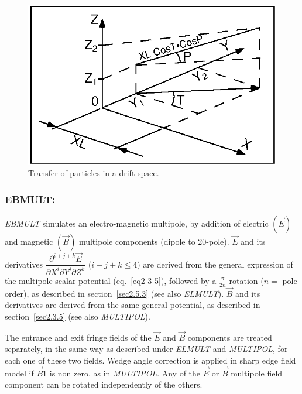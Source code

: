 \begin{figure}[H]
\centerline{\includegraphics[width=15cm]{Fig23.ps}}
\caption{\label{fig23}Transfer of particles in a drift space.}
\end{figure}
\vfill

\newpage
\subsubsection*{EBMULT: \EBMULTTitl}\label{EBMULT} 
\medskip

\noindent\textsl{EBMULT} simulates an electro-magnetic multipole, by addition of
electric $ (\vec  E) $ and magnetic $ (\vec  B) $ multipole components (dipole to 20-pole). 
$\vec  E $ and its derivatives 
$ \dfrac{\partial^{ i+j+k} \vec  E }{ \partial X^i\partial Y^j\partial Z^k} $ 
($i+j+k \le 4$) are derived 
from the general expression of the multipole scalar potential (eq.~\ref{eq2-3-5}), followed by a 
$ \frac{\pi }{2n} $ rotation  ($n= $ pole order), 
as described in section~\ref{sec2.5.3} (see also \textsl{ELMULT}). $ \vec  B $ and its
derivatives are derived from the same general potential, as described in section~\ref{sec2.3.5} 
(see also \textsl{MULTIPOL}). 

\noindent The entrance and exit fringe fields of the $ \vec  E $ and $ \vec  B$ components are treated 
separately, in the same way as described under \textsl{ELMULT} 
 and \textsl{MULTIPOL},
for each one of these two fields. Wedge angle correction is applied in sharp edge field model if $ \vec  B1$ is non zero, as in \textsl{MULTIPOL}. Any of the $ \vec  E $ or $ \vec  B $ multipole field
component can be rotated independently of the others. 

